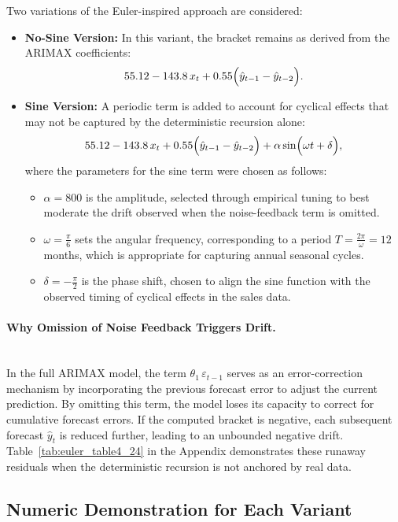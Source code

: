 \documentclass[10pt]{article}
\begin{document}
Two variations of the Euler-inspired approach are considered:
\begin{itemize}
    \item \textbf{No-Sine Version:} In this variant, the bracket remains as derived from the ARIMAX coefficients:
    \[
    55.12 - 143.8\,x_t + 0.55\Bigl(\hat{y}_{t-1} - \hat{y}_{t-2}\Bigr).
    \]
    \item \textbf{Sine Version:} A periodic term is added to account for cyclical effects that may not be captured by the deterministic recursion alone:
    \[
    55.12 - 143.8\,x_t + 0.55\Bigl(\hat{y}_{t-1} - \hat{y}_{t-2}\Bigr) + \alpha\sin\Bigl(\omega t + \delta\Bigr),
    \]
    where the parameters for the sine term were chosen as follows:
    \begin{itemize}
        \item \(\alpha = 800\) is the amplitude, selected through empirical tuning to best moderate the drift observed when the noise-feedback term is omitted.
        \item \(\omega = \frac{\pi}{6}\) sets the angular frequency, corresponding to a period \(T = \frac{2\pi}{\omega} = 12\) months, which is appropriate for capturing annual seasonal cycles.
        \item \(\delta = -\frac{\pi}{2}\) is the phase shift, chosen to align the sine function with the observed timing of cyclical effects in the sales data.
    \end{itemize}
\end{itemize}

\paragraph{Why Omission of Noise Feedback Triggers Drift.}\\
In the full ARIMAX model, the term \(\theta_1\,\varepsilon_{t-1}\) serves as an error-correction mechanism by incorporating the previous forecast error to adjust the current prediction. By omitting this term, the model loses its capacity to correct for cumulative forecast errors. If the computed bracket is negative, each subsequent forecast \(\hat{y}_t\) is reduced further, leading to an unbounded negative drift. Table~\ref{tab:euler_table4_24} in the Appendix demonstrates these runaway residuals when the deterministic recursion is not anchored by real data.

\subsection{Numeric Demonstration for Each Variant}
\end{document}
